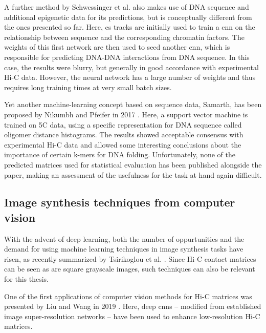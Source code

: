 A further method by Schwessinger et al. \cite{Schwessinger2019} also makes use of DNA sequence and additional epigenetic data for its predictions,
but is conceptually different from the ones presented so far.
Here, \acrshort{cs} tracks are initially used to train a \acrshort{cnn} on the relationship between sequence and 
the corresponding chromatin factors. The weights of this first network are then used to seed another \acrlong{cnn},
which is responsible for predicting DNA-DNA interactions from DNA sequence.
In this case, the results were blurry, but generally in good accordance with experimental Hi-C data.
However, the neural network has a large number of weights and thus requires long training times at very small batch sizes.

Yet another machine-learning concept based on sequence data, Samarth, has been proposed by Nikumbh and Pfeifer in 2017 \cite{Nikumbh2017}.
Here, a support vector machine is trained on 5C data, using a specific representation for DNA sequence called oligomer distance histograms.
The results showed acceptable consensus with experimental Hi-C data and allowed some interesting conclusions
about the importance of certain k-mers for DNA folding. 
Unfortunately, none of the predicted matrices used for statistical evaluation has been published alongside the paper,
making an assessment of the usefulness for the task at hand again difficult.

\subsection{Image synthesis techniques from computer vision} \label{sec:prior:generativeCV}
With the advent of deep learning, both the number of oppurtunities and the demand for using machine learning techniques 
in image synthesis tasks have risen, as recently summarized by Tsirikoglou et al. \cite{Tsirikoglou2020}.
Since Hi-C contact matrices can be seen as are square grayscale images, such techniques can also be relevant for this thesis.

One of the first applications of computer vision methods for Hi-C matrices was presented by Liu and Wang in 2019 \cite{Liu2019b}.
Here, deep \acrlong{cnn}s -- modified from established image super-resolution networks \xxx -- have been used to enhance low-resolution Hi-C matrices.

